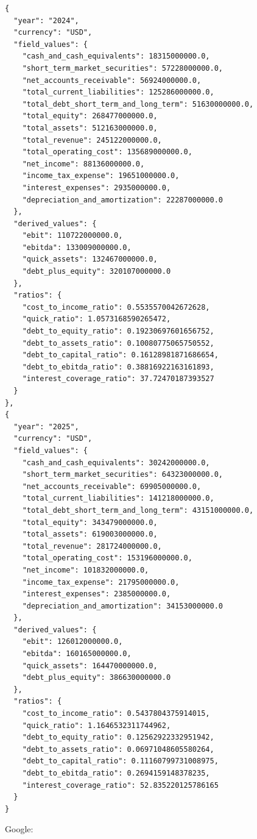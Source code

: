 \documentclass[12pt,a4paper]{article}
\begin{document}
\begin{lstlisting}[style=json, caption={Calculated financial ratios for Microsoft (FY\,2024--2025)}, label=lst:ratios_microsoft]
{
  "year": "2024",
  "currency": "USD",
  "field_values": {
    "cash_and_cash_equivalents": 18315000000.0,
    "short_term_market_securities": 57228000000.0,
    "net_accounts_receivable": 56924000000.0,
    "total_current_liabilities": 125286000000.0,
    "total_debt_short_term_and_long_term": 51630000000.0,
    "total_equity": 268477000000.0,
    "total_assets": 512163000000.0,
    "total_revenue": 245122000000.0,
    "total_operating_cost": 135689000000.0,
    "net_income": 88136000000.0,
    "income_tax_expense": 19651000000.0,
    "interest_expenses": 2935000000.0,
    "depreciation_and_amortization": 22287000000.0
  },
  "derived_values": {
    "ebit": 110722000000.0,
    "ebitda": 133009000000.0,
    "quick_assets": 132467000000.0,
    "debt_plus_equity": 320107000000.0
  },
  "ratios": {
    "cost_to_income_ratio": 0.5535570042672628,
    "quick_ratio": 1.0573168590265472,
    "debt_to_equity_ratio": 0.19230697601656752,
    "debt_to_assets_ratio": 0.10080775065750552,
    "debt_to_capital_ratio": 0.16128981871686654,
    "debt_to_ebitda_ratio": 0.38816922163161893,
    "interest_coverage_ratio": 37.72470187393527
  }
},
{
  "year": "2025",
  "currency": "USD",
  "field_values": {
    "cash_and_cash_equivalents": 30242000000.0,
    "short_term_market_securities": 64323000000.0,
    "net_accounts_receivable": 69905000000.0,
    "total_current_liabilities": 141218000000.0,
    "total_debt_short_term_and_long_term": 43151000000.0,
    "total_equity": 343479000000.0,
    "total_assets": 619003000000.0,
    "total_revenue": 281724000000.0,
    "total_operating_cost": 153196000000.0,
    "net_income": 101832000000.0,
    "income_tax_expense": 21795000000.0,
    "interest_expenses": 2385000000.0,
    "depreciation_and_amortization": 34153000000.0
  },
  "derived_values": {
    "ebit": 126012000000.0,
    "ebitda": 160165000000.0,
    "quick_assets": 164470000000.0,
    "debt_plus_equity": 386630000000.0
  },
  "ratios": {
    "cost_to_income_ratio": 0.5437804375914015,
    "quick_ratio": 1.1646532311744962,
    "debt_to_equity_ratio": 0.12562922332951942,
    "debt_to_assets_ratio": 0.06971048605580264,
    "debt_to_capital_ratio": 0.11160799731008975,
    "debt_to_ebitda_ratio": 0.2694159148378235,
    "interest_coverage_ratio": 52.835220125786165
  }
}
\end{lstlisting}

Google:
\end{document}
